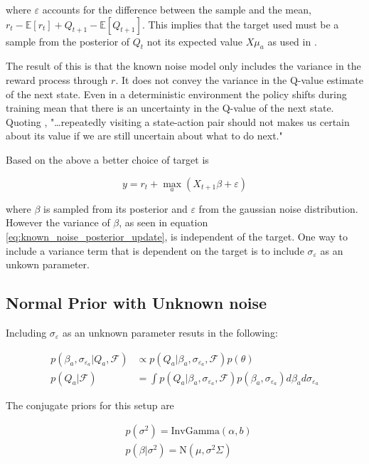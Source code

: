 where $\varepsilon$ accounts for the difference between the sample and the mean, $r_t - \mathbb{E}[r_t] + Q_{t+1} - \mathbb{E}[Q_{t+1}]$. This implies that the target used must be a sample from the posterior of $Q_t$ not its expected value $X\mu_a$ as used in \cite{azziz_2018}. 

The result of this is that the known noise model only includes the variance in the reward process through $r$. It does not convey the variance in the Q-value estimate of the next state. Even in a deterministic environment the policy shifts during training mean that there is an uncertainty in the Q-value of the next state. Quoting \cite{moerland_2017},  "\dots repeatedly visiting a state-action pair should not makes us certain about its value if we are still uncertain about what to do next."

Based on the above a better choice of target is

$$
y = r_t + \max_a (X_{t+1}\beta + \varepsilon)
$$

where $\beta$ is sampled from its posterior and $\varepsilon$ from the gaussian noise distribution. However the variance of $\beta$, as seen in equation \ref{eq:known_noise_posterior_update}, is independent of the target. One way to include a variance term that is dependent on the target is to include $\sigma_{\varepsilon}$ as an unkown parameter.

\subsection{Normal Prior with Unknown noise}

Including $\sigma_{\varepsilon}$ as an unknown parameter resuts in the following:

\begin{align*}
    p(\beta_a, \sigma_{\varepsilon_a}|Q_a, \mathcal{F}) &\propto p(Q_a| \beta_a, \sigma_{\varepsilon_a}, \mathcal{F})p(\theta) \\
    p(Q_a|\mathcal{F}) &= \int p(Q_a|\beta_a, \sigma_{\varepsilon_a}, \mathcal{F}) p(\beta_a, \sigma_{\varepsilon_a})d\beta_a d\sigma_{\varepsilon_a}
\end{align*}

The conjugate priors for this setup are

\begin{align*}
    & p(\sigma^2) = \text{InvGamma}(\alpha, b)          \\
    & p(\beta|\sigma^2) = \text{N}(\mu, \sigma^2\Sigma) 
\end{align*}

